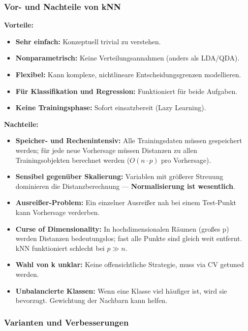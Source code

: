 \subsubsection{Vor- und Nachteile von kNN}

\textbf{Vorteile:}
\begin{itemize}[leftmargin=1.5em]
    \item \textbf{Sehr einfach:} Konzeptuell trivial zu verstehen.
    \item \textbf{Nonparametrisch:} Keine Verteilungsannahmen (anders als LDA/QDA).
    \item \textbf{Flexibel:} Kann komplexe, nichtlineare Entscheidungsgrenzen modellieren.
    \item \textbf{Für Klassifikation und Regression:} Funktioniert für beide Aufgaben.
    \item \textbf{Keine Trainingsphase:} Sofort einsatzbereit (Lazy Learning).
\end{itemize}

\textbf{Nachteile:}
\begin{itemize}[leftmargin=1.5em]
    \item \textbf{Speicher- und Rechenintensiv:} Alle Trainingsdaten müssen gespeichert werden; für jede neue Vorhersage müssen Distanzen zu allen Trainingsobjekten berechnet werden ($O(n \cdot p)$ pro Vorhersage).
    \item \textbf{Sensibel gegenüber Skalierung:} Variablen mit größerer Streuung dominieren die Distanzberechnung — \textbf{Normalisierung ist wesentlich}.
    \item \textbf{Ausreißer-Problem:} Ein einzelner Ausreißer nah bei einem Test-Punkt kann Vorhersage verderben.
    \item \textbf{Curse of Dimensionality:} In hochdimensionalen Räumen (großes p) werden Distanzen bedeutungslos; fast alle Punkte sind gleich weit entfernt. kNN funktioniert schlecht bei $p \gg n$.
    \item \textbf{Wahl von k unklar:} Keine offensichtliche Strategie, muss via CV getuned werden.
    \item \textbf{Unbalancierte Klassen:} Wenn eine Klasse viel häufiger ist, wird sie bevorzugt. Gewichtung der Nachbarn kann helfen.
\end{itemize}

\subsubsection{Varianten und Verbesserungen}

